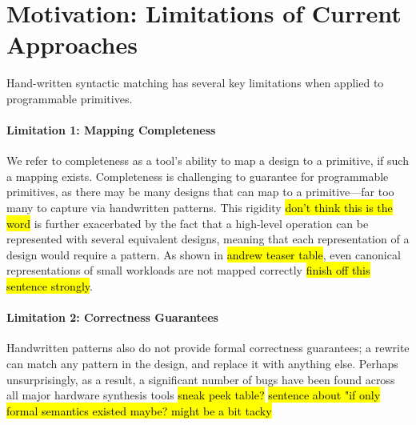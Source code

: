 



  



\section{Motivation: Limitations of Current Approaches}
\label{sec:completeness}

Hand-written syntactic matching
  has several key limitations 
  when applied to programmable primitives.
\paragraph{Limitation 1: Mapping Completeness}
We refer to completeness as 
  a tool's ability to map a design
  to a primitive, if such a mapping exists.
Completeness is challenging
  to guarantee for programmable primitives,
  as there may be many designs that can
  map to a primitive---far too many to 
  capture via handwritten patterns.
This rigidity \hl{don't think this is the word} 
  is further exacerbated by the fact that a high-level operation can be represented with 
  several equivalent designs, meaning that each representation of a design would require
  a pattern.
As shown in \hl{andrew teaser table},
  even canonical representations of small workloads are not mapped 
  correctly \hl{finish off this sentence strongly}.

\paragraph{Limitation 2: Correctness Guarantees}
Handwritten patterns also do not provide formal
  correctness guarantees; a rewrite can
  match any pattern in the design, and 
  replace it with anything else.
Perhaps unsurprisingly, as a result, a
  significant number of bugs have been found
  across all major hardware synthesis tools \hl{sneak peek table?}
\hl{sentence about "if only formal semantics existed maybe? might be a bit tacky}
